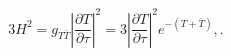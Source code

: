 \begin{equation}
3 H^2 =  g_{T \bar{T}} |\frac{\partial T}{\partial \tau}|^2= 3 |\frac{\partial T}{\partial \tau}|^2 e^{-(T + \bar{T})}, .
\end{equation}


